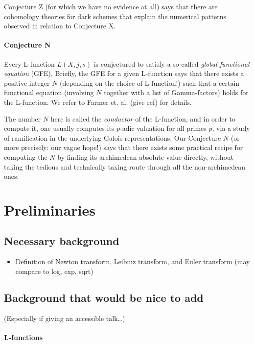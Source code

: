 \documentclass[paper=a4, fontsize=11pt]{scrartcl} %
\numberwithin{equation}{section} %
\numberwithin{figure}{section} %
\numberwithin{table}{section} %
\begin{document}
Conjecture Z (for which we have no evidence at all) says that there are cohomology theories for dark schemes that explain the numerical patterns observed in relation to Conjecture X.


\paragraph{Conjecture N}

Every L-function $L(X, j, s)$ is conjectured to satisfy a so-called \emph{global functional equation} (GFE). Briefly, the GFE for a given L-function says that there exists a positive integer $N$ (depending on the choice of L-function!) such that a certain functional equation (involving $N$ together with a list of Gamma-factors) holds for the L-function. We refer to Farmer et. al. (give ref) for details.

The number $N$ here is called the \emph{conductor} of the L-function, and in order to compute it, one usually computes its $p$-adic valuation for all primes $p$, via a study of ramification in the underlying Galois representations. Our Conjecture $N$ (or more precisely: our vague hope!) says that there exists some practical recipe for computing the $N$ by finding its archimedean absolute value directly, without taking the tedious and technically taxing route through all the non-archimedean ones.


\section{Preliminaries}

\subsection{Necessary background}

\begin{itemize}
\item Definition of Newton transform, Leibniz transform, and Euler transform (may compare to log, exp, sqrt)

\end{itemize}

\subsection{Background that would be nice to add}

(Especially if giving an accessible talk\ldots)
\paragraph{L-functions}
\end{document}
